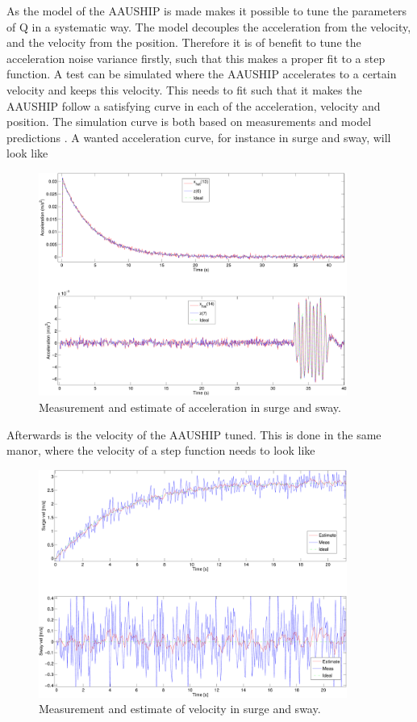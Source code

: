 As the model of the AAUSHIP is made makes it possible to tune the parameters of Q in a systematic way. The model decouples the acceleration from the velocity, and the velocity from the position. Therefore it is of benefit to tune the acceleration noise variance firstly, such that this makes a proper fit to a step function. A test can be simulated where the AAUSHIP accelerates to a certain velocity and keeps this velocity. This needs to fit such that it makes the AAUSHIP follow a satisfying curve in each of the acceleration, velocity and position. The simulation curve is both based on measurements and model predictions . A wanted acceleration curve, for instance in surge and sway, will look like
\begin{figure}
  \includegraphics[width=0.9\textwidth]{../../code/matlab/accel0,00001}
  \caption{Measurement and estimate of acceleration in surge and sway.}
  \label{fig:uvacceltest}
\end{figure}
Afterwards is the velocity of the AAUSHIP tuned. This is done in the same manor, where the velocity of a step function needs to look like
\begin{figure}
  \includegraphics[width=0.9\textwidth]{../../code/matlab/uv0,00001}
  \caption{Measurement and estimate of velocity in surge and sway.}
  \label{fig:uvtest}
\end{figure}
